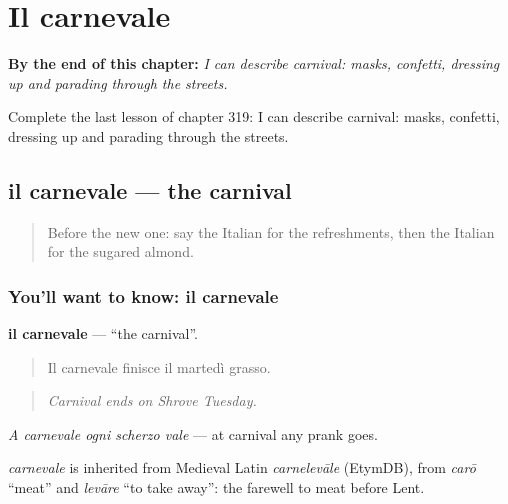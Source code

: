 
\chapter{Il carnevale}
\label{ch:it-il-carnevale}

\begin{chapteropening}
\textbf{By the end of this chapter:} \emph{I can describe carnival: masks, confetti, dressing up and parading through the streets.}

Complete the last lesson of chapter 319: I can describe carnival: masks, confetti, dressing up and parading through the streets.
\end{chapteropening}

\section[il carnevale]{il carnevale — the carnival}

\label{lesson:IT-C319-carnevale}



\begin{quote}
Before the new one: say the Italian for the refreshments, then the Italian for the sugared almond.
\end{quote}

\subsection*{You'll want to know: il carnevale}
\textbf{il carnevale} — \textquotedblleft{}the carnival\textquotedblright{}.

\begin{quote}
Il carnevale finisce il martedì grasso.
\end{quote}

\begin{quote}
\emph{Carnival ends on Shrove Tuesday.}
\end{quote}

\emph{A carnevale ogni scherzo vale} — at carnival any prank goes.

\begin{cousinweb}
\emph{carnevale} is inherited from Medieval Latin \emph{carnelevāle} (EtymDB), from \emph{carō} \textquotedblleft{}meat\textquotedblright{} and \emph{levāre} \textquotedblleft{}to take away\textquotedblright{}: the farewell to meat before Lent.
\end{cousinweb}


